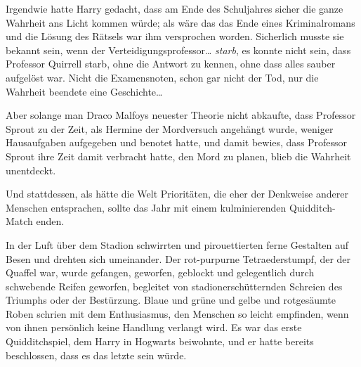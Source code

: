 Irgendwie hatte Harry gedacht, dass am Ende des Schuljahres sicher die ganze Wahrheit ans Licht kommen würde; als wäre das das Ende eines Kriminalromans und die Lösung des Rätsels war ihm versprochen worden. Sicherlich musste sie bekannt sein, wenn der Verteidigungsprofessor… \emph{starb}, es konnte nicht sein, dass Professor Quirrell starb, ohne die Antwort zu kennen, ohne dass alles sauber aufgelöst war. Nicht die Examensnoten, schon gar nicht der Tod, nur die Wahrheit beendete eine Geschichte…

Aber solange man Draco Malfoys neuester Theorie nicht abkaufte, dass Professor Sprout zu der Zeit, als Hermine der Mordversuch angehängt wurde, weniger Hausaufgaben aufgegeben und benotet hatte, und damit bewies, dass Professor Sprout ihre Zeit damit verbracht hatte, den Mord zu planen, blieb die Wahrheit unentdeckt.

Und stattdessen, als hätte die Welt Prioritäten, die eher der Denkweise anderer Menschen entsprachen, sollte das Jahr mit einem kulminierenden Quidditch-Match enden.

\later

In der Luft über dem Stadion schwirrten und pirouettierten ferne Gestalten auf Besen und drehten sich umeinander. Der rot-purpurne Tetraederstumpf, der der Quaffel war, wurde gefangen, geworfen, geblockt und gelegentlich durch schwebende Reifen geworfen, begleitet von stadionerschütternden Schreien des Triumphs oder der Bestürzung. Blaue und grüne und gelbe und rotgesäumte Roben schrien mit dem Enthusiasmus, den Menschen so leicht empfinden, wenn von ihnen persönlich keine Handlung verlangt wird. Es war das erste Quidditchspiel, dem Harry in Hogwarts beiwohnte, und er hatte bereits beschlossen, dass es das letzte sein würde.

